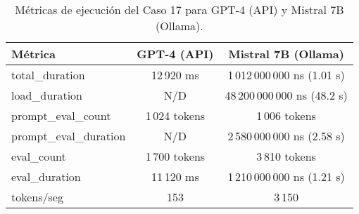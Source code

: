 
\begin{table}[h!]
\centering
\begin{tabular}{|l|c|c|}
\hline
\textbf{Métrica} & \textbf{GPT-4 (API)} & \textbf{Mistral 7B (Ollama)} \\
\hline
total\_duration & 12\,920 ms & 1\,012\,000\,000 ns (1.01 s) \\
load\_duration & N/D & 48\,200\,000\,000 ns (48.2 s) \\
prompt\_eval\_count & 1\,024 tokens & 1\,006 tokens \\
prompt\_eval\_duration & N/D & 2\,580\,000\,000 ns (2.58 s) \\
eval\_count & 1\,700 tokens & 3\,810 tokens \\
eval\_duration & 11\,120 ms & 1\,210\,000\,000 ns (1.21 s) \\
tokens/seg & 153 & 3\,150 \\
\hline
\end{tabular}
\caption{Métricas de ejecución del Caso 17 para GPT-4 (API) y Mistral 7B (Ollama).}
\end{table}
